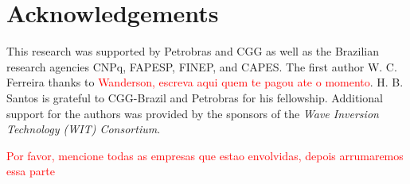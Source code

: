 \documentclass{vie16}
\newcommand{\att}[1]{\textcolor{red}{#1}}
\begin{document}
\section{Acknowledgements}

This research was supported by Petrobras and CGG as well as the
Brazilian research agencies CNPq, FAPESP, FINEP, and CAPES. The first author 
W. C. Ferreira thanks to \att{Wanderson, escreva aqui quem te pagou ate o 
momento}. H. B. Santos is grateful to CGG-Brazil and Petrobras for his 
fellowship. Additional support for the authors was provided by the sponsors 
of the \textit{Wave Inversion Technology (WIT) Consortium}.

\att{Por favor, mencione todas as empresas que estao envolvidas, depois 
arrumaremos essa parte}


\end{document}
